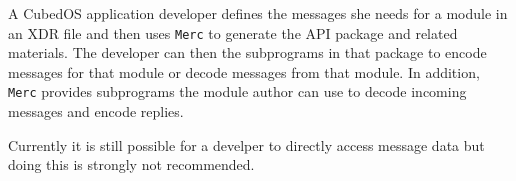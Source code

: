 A CubedOS application developer defines the messages she needs for a module in an XDR file and
then uses \texttt{Merc} to generate the API package and related materials. The developer can
then the subprograms in that package to encode messages for that module or decode messages from
that module. In addition, \texttt{Merc} provides subprograms the module author can use to decode
incoming messages and encode replies.

Currently it is still possible for a develper to directly access message data but doing this is
strongly not recommended. 
